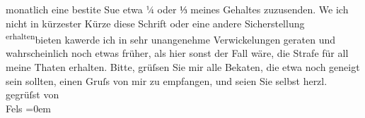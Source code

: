                     monatlich eine besti{\geminationm}te Su{\geminationm}e etwa ¼ \introOben{}oder ⅓\introOben{} meines
                    Gehaltes zuzusenden. We{\geminationn} ich nicht in kürzester
                    Kürze diese Schrift oder eine andere Sicherstellung \substVorne{}\textsuperscript{erhalten}{\allowbreak}\substDazwischen{}bieten ka{\geminationn}\substHinten{}{ }{\pb}werde ich in sehr unangenehme
                    Verwickelungen geraten und wahrscheinlich noch etwas früher, als hier sonst der
                    Fall wäre, die Strafe für all meine Thaten erhalten.\pend
           \pstart
           Bitte, grüſsen Sie mir alle Beka{\geminationn}ten, die etwa noch
                    geneigt sein sollten, einen Gruſs von mir zu empfangen, und seien Sie selbst
                    herzl. gegrüſst\pend
           \pstart
           von{\\[\baselineskip]}\spacefill\mbox{Fels}\pend
           \leftskip=0em{}\endnumbering{}  
      